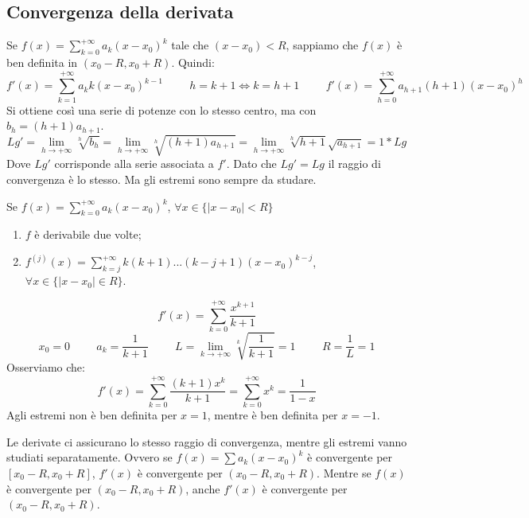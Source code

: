 \subsection*{Convergenza della derivata}
Se $f(x)=\sum^{+\infty}_{k=0}a_k(x-x_0)^k$ tale che $(x-x_0)<R$, sappiamo che $f(x)$ è ben definita in $(x_0-R, x_0+R)$. Quindi:
\begin{equation*}
    f'(x)=\sum^{+\infty}_{k=1}a_kk(x-x_0)^{k-1}\hspace{1cm}h=k+1\Leftrightarrow k=h+1\hspace{1cm}f'(x)=\sum^{+\infty}_{h=0}a_{h+1}(h+1)(x-x_0)^{h}
\end{equation*}
Si ottiene così una serie di potenze con lo stesso centro, ma con $b_h=(h+1)a_{h+1}$.
\begin{equation*}
    Lg'=\lim_{h\to+\infty}\sqrt[h]{b_h}=\lim_{h\to+\infty}\sqrt[h]{(h+1)a_{h+1}}=\lim_{h\to+\infty}\sqrt[h]{h+1}\sqrt{a_{h+1}}=1*Lg
\end{equation*}
Dove $Lg'$ corrisponde alla serie associata a $f'$. Dato che $Lg'=Lg$ il raggio di convergenza è lo stesso. Ma gli estremi sono sempre da studare.

\begin{thm}
    Se $f(x)=\sum^{+\infty}_{k=0}a_k(x-x_0)^k$, $\forall x\in\{|x-x_0|<R\}$
    \begin{enumerate}
        \item $f$ è derivabile due volte;
        \item $f^{(j)}(x)=\sum^{+\infty}_{k=j}k(k+1)...(k-j+1)(x-x_0)^{k-j}$, $\forall x\in\{|x-x_0|\in R\}$.
    \end{enumerate}
    \begin{example}
         \begin{equation*}f'(x)=\sum^{+\infty}_{k=0}\frac{x^{k+1}}{k+1}\end{equation*}
         \begin{equation*}x_0=0\hspace{1cm}a_k=\frac{1}{k+1}\hspace{1cm}L=\lim_{k\to+\infty}\sqrt[k]{\frac{1}{k+1}}=1\hspace{1cm}R=\frac{1}{L}=1\end{equation*}
         Osserviamo che:
         \begin{equation*}
             f'(x)=\sum^{+\infty}_{k=0}\frac{(k+1)x^k}{k+1}=\sum^{+\infty}_{k=0}x^k=\frac{1}{1-x}
         \end{equation*}
         Agli estremi non è ben definita per $x=1$, mentre è ben definita per $x=-1$. 
    \end{example}
\end{thm}
Le derivate ci assicurano lo stesso raggio di convergenza, mentre gli estremi vanno studiati separatamente. Ovvero se $f(x)=\sum a_k(x-x_0)^k$ è convergente per $[x_0-R,x_0+R]$, $f'(x)$ è convergente per $(x_0-R,x_0+R)$. Mentre se $f(x)$ è convergente per $(x_0-R,x_0+R)$, anche $f'(x)$ è convergente per $(x_0-R,x_0+R)$.


